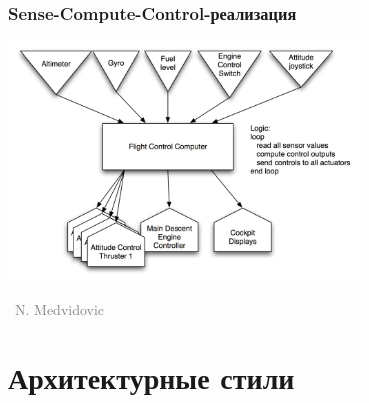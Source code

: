 \documentclass[xetex,mathserif,serif]{beamer}
\newcommand{\attribution}[1] {
	\vspace{-5mm}\begin{flushright}\begin{scriptsize}\textcolor{gray}{\textcopyright\, #1}\end{scriptsize}\end{flushright}
}
\begin{document}
	\begin{frame}
		\frametitle{Sense-Compute-Control-реализация}
		\begin{center}
			\includegraphics[width=0.7\textwidth]{senseComputeControlLunarLander.png}
			\attribution{N. Medvidovic}
		\end{center}
	\end{frame}

	\section{Архитектурные стили}
\end{document}
